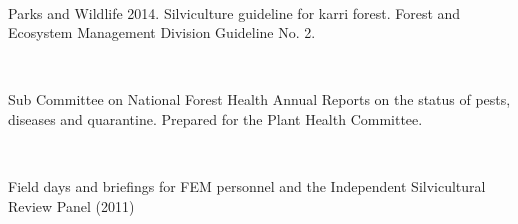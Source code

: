 \documentclass[version=last, paper=a4, DIV=18, usenames, dvipsnames]{scrartcl}
\begin{document}
~

Parks and Wildlife 2014. Silviculture guideline for karri forest. Forest
and Ecosystem Management Division Guideline No. 2.

~

Sub Committee on National Forest Health Annual Reports on the status of
pests, diseases and quarantine. Prepared for the Plant Health Committee.

~

Field days and briefings for FEM personnel and the Independent
Silvicultural Review Panel (2011)





\clearpage
\end{document}
